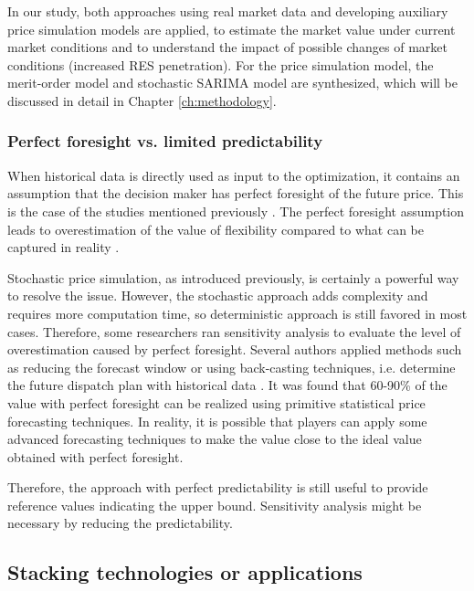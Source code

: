 In our study, both approaches using real market data and developing auxiliary price simulation models are applied, to estimate the market value under current market conditions and to understand the impact of possible changes of market conditions (increased RES penetration). For the price simulation model, the merit-order model and stochastic SARIMA model are synthesized, which will be discussed in detail in Chapter \ref{ch:methodology}.

\subsubsection{Perfect foresight vs. limited predictability}
\label{sec:perfect-forecast}
When historical data is directly used as input to the optimization, it contains an assumption that the decision maker has perfect foresight of the future price. This is the case of the studies mentioned previously \cite{Walawalkar2007,Sioshansi2009,Byrne2012,Bradbury2014,McConnell2015,Berrada2016,Salles2017}. The perfect foresight assumption leads to overestimation of the value of flexibility compared to what can be captured in reality \cite{Zucker2013}.

Stochastic price simulation, as introduced previously, is certainly a powerful way to resolve the issue. However, the stochastic approach adds complexity and requires more computation time, so deterministic approach is still favored in most cases. Therefore, some researchers ran sensitivity analysis to evaluate the level of overestimation caused by perfect foresight. Several authors applied methods such as reducing the forecast window \cite{Connolly2011} or using back-casting techniques, i.e. determine the future dispatch plan with historical data \cite{Sioshansi2009,Drury2011,Bathurst2003}. It was found that 60-90\% of the value with perfect foresight can be realized using primitive statistical price forecasting techniques. In reality, it is possible that players can apply some advanced forecasting techniques to make the value close to the ideal value obtained with perfect foresight. 

Therefore, the approach with perfect predictability is still useful to provide reference values indicating the upper bound. Sensitivity analysis might be necessary by reducing the predictability.

\subsection{Stacking technologies or applications}

